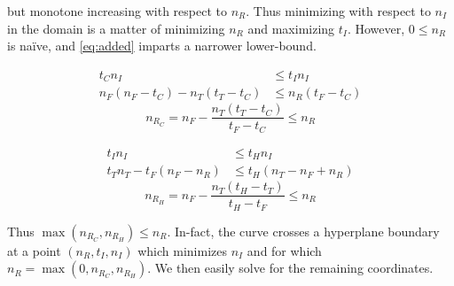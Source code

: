 \documentclass{article}
\newcommand{\tightmathT}{%
    \setlength{\abovedisplayskip}{0pt}
    \setlength{\abovedisplayshortskip}{0pt}
}
\newcommand{\tightmathB}{%
    \setlength{\belowdisplayskip}{0pt}
    \setlength{\belowdisplayshortskip}{0pt}
}
\newcommand{\tightmath}{%
    \tightmathT%
    \tightmathB%
}
\begin{document}
but monotone increasing with respect to $n_R$.
Thus minimizing with respect to $n_I$ in the domain is
a matter of minimizing $n_R$ and maximizing $t_I$.
However, $0\le n_R$ is naïve, and \autoref{eq:added}
imparts a narrower lower-bound.
\begin{multicols}{2}
    \raggedcolumns
    \tightmath
    \begin{align*}
        t_C n_I &\le t_I n_I \\
        n_F(n_F-t_C)-n_T(t_T-t_C) &\le n_R(t_F-t_C)
    \end{align*}
    \begin{equation}\label{eq:nRC}
        n_{R_C} = n_F-\frac{n_T(t_T-t_C)}{t_F-t_C} \le n_R
    \end{equation}
    \columnbreak

    \begin{align*}
        t_I n_I &\le t_H n_I \\
        t_T n_T-t_F(n_F-n_R) &\le t_H(n_T-n_F+n_R)
    \end{align*}
    \begin{equation}\label{eq:nRH}
        n_{R_H} = n_F-\frac{n_T(t_H-t_T)}{t_H-t_F} \le n_R
    \end{equation}
\end{multicols}
\noindent
Thus $\max(n_{R_C},n_{R_H}) \le n_R$.
In-fact, the curve crosses a hyperplane boundary at a point $(n_R,t_I,n_I)$
which minimizes $n_I$ and for which $n_R=\max(0, n_{R_C}, n_{R_H})$.
We then easily solve for the remaining coordinates.
\end{document}
